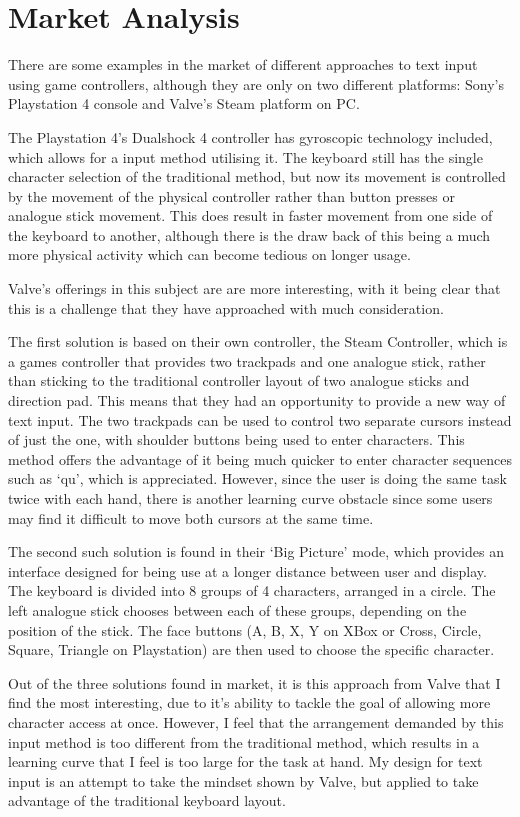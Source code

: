 \documentclass[requirements.tex]{subfiles}
\begin{document}
\section{Market Analysis} %
\label{sec:market_analysis}

There are some examples in the market of different approaches to text input
using game controllers, although they are only on two different platforms:
Sony's Playstation 4 console and Valve's Steam platform on PC.

The Playstation 4's Dualshock 4 controller has gyroscopic technology included,
which allows for a input method utilising it. The keyboard still has the single
character selection of the traditional method, but now its movement is
controlled by the movement of the physical controller rather than button presses
or analogue stick movement. This does result in faster movement from one side of
the keyboard to another, although there is the draw back of this being a much
more physical activity which can become tedious on longer usage.

Valve's offerings in this subject are are more interesting, with it being clear
that this is a challenge that they have approached with much consideration.

The first solution is based on their own controller, the Steam Controller, which
is a games controller that provides two trackpads and one analogue stick, rather
than sticking to the traditional controller layout of two analogue sticks and
direction pad. This means that they had an opportunity to provide a new way of
text input. The two trackpads can be used to control two separate cursors
instead of just the one, with shoulder buttons being used to enter characters.
This method offers the advantage of it being much quicker to enter character
sequences such as `qu', which is appreciated. However, since the user is doing
the same task twice with each hand, there is another learning curve obstacle
since some users may find it difficult to move both cursors at the same time.

The second such solution is found in their `Big Picture' mode, which provides an
interface designed for being use at a longer distance between user and display.
The keyboard is divided into 8 groups of 4 characters, arranged in a circle.
The left analogue stick chooses between each of these groups, depending on the
position of the stick. The face buttons (A, B, X, Y on XBox or Cross, Circle,
Square, Triangle on Playstation) are then used to choose the specific character.

Out of the three solutions found in market, it is this approach from Valve that
I find the most interesting, due to it's ability to tackle the goal of allowing
more character access at once. However, I feel that the arrangement demanded by
this input method is too different from the traditional method, which results
in a learning curve that I feel is too large for the task at hand. My design for
text input is an attempt to take the mindset shown by Valve, but applied to
take advantage of the traditional keyboard layout.

\newpage
\end{document}
